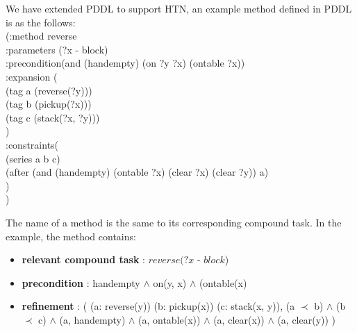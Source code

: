 
We have extended PDDL to support HTN, an example method defined in PDDL is as the follows:\\[0.2cm]
\hspace*{1cm}(:method reverse\\
\hspace*{1.5cm}  :parameters  (?x - block)\\
\hspace*{1.5cm}  :precondition(and (handempty) (on ?y ?x) (ontable ?x))\\
\hspace*{1.5cm}  :expansion  (\\
\hspace*{2cm}        (tag a (reverse(?y)))\\
\hspace*{2cm}        (tag b (pickup(?x)))\\
\hspace*{2cm}        (tag c (stack(?x, ?y)))\\
\hspace*{1.5cm}  )\\
\hspace*{1.5cm}  :constraints(\\
\hspace*{2cm}        (series a b c)\\
\hspace*{2cm}        (after (and (handempty) (ontable ?x) (clear ?x) (clear ?y)) a)\\
\hspace*{1.5cm}  )\\
\hspace*{1cm})

The name of a method is the same to its corresponding compound task. In the example, the method contains:
\begin{itemize}\itemsep0pt \parskip0pt 
\item[] \textbf{relevant compound task} : $reverse(?x$ - $block$)
\item[] \textbf{precondition} : handempty $\wedge$ on(y, x) $\wedge$ (ontable(x)
\item[] \textbf{refinement} : ( (a: reverse(y)) (b: pickup(x)) (c: stack(x, y)),  (a $\prec$ b) $\wedge$ (b $\prec$ c) $\wedge$ (a, handempty) $\wedge$ (a, ontable(x)) $\wedge$ (a, clear(x)) $\wedge$ (a, clear(y)) )
\end{itemize}

